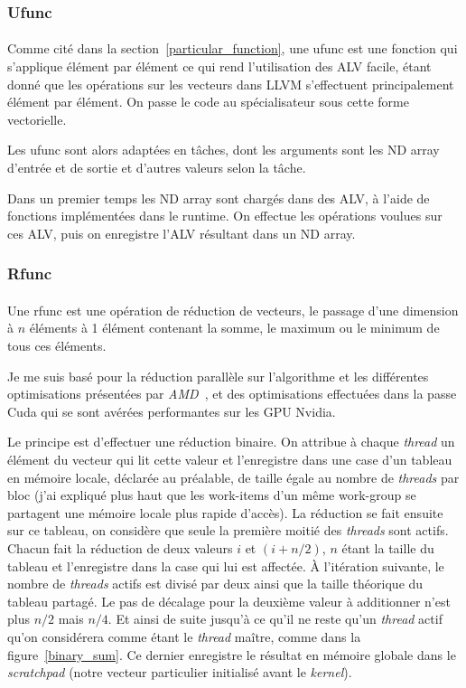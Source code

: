 \subsubsection{Ufunc}
\paragraph{}
Comme cité dans la section~\ref{particular_function}, une ufunc est une fonction
qui s'applique élément par élément ce qui rend l'utilisation des ALV facile,
étant donné que les opérations sur les vecteurs dans LLVM s'effectuent
principalement élément par élément. On passe le code au spécialisateur sous
cette forme vectorielle.

Les ufunc sont alors adaptées en tâches, dont les arguments sont les ND array
d'entrée et de sortie et d'autres valeurs selon la tâche.

Dans un premier temps les ND array sont chargés dans des ALV, à l'aide de
fonctions implémentées dans le runtime. On effectue les opérations voulues sur
ces ALV, puis on enregistre l’ALV résultant dans un ND array.

\subsubsection{Rfunc}
\paragraph{}
Une rfunc est une opération de réduction de vecteurs, le passage d'une dimension
à $n$ éléments à 1 élément contenant la somme, le maximum ou le minimum de tous
ces éléments.

Je me suis basé pour la réduction parallèle sur l'algorithme et les différentes
optimisations présentées par \emph{AMD}~\cite{ocl_reduction}, et des
optimisations effectuées dans la passe Cuda qui se sont avérées performantes sur
les GPU Nvidia.

Le principe est d'effectuer une réduction binaire. On attribue à chaque
\emph{thread} un élément du vecteur qui lit cette valeur et l'enregistre dans
une case d'un tableau en mémoire locale, déclarée au préalable, de taille égale
au nombre de \emph{threads} par bloc (j'ai expliqué plus haut que les work-items
d'un même work-group se partagent une mémoire locale plus rapide d'accès). La
réduction se fait ensuite sur ce tableau, on considère que seule la première
moitié des \emph{threads} sont actifs. Chacun fait la réduction de deux valeurs
$i$ et $(i+n/2)$, $n$ étant la taille du tableau et l'enregistre dans la case
qui lui est affectée. À l'itération suivante, le nombre de \emph{threads} actifs
est divisé par deux ainsi que la taille théorique du tableau partagé. Le pas de
décalage pour la deuxième valeur à additionner n'est plus $n/2$ mais $n/4$. Et
ainsi de suite jusqu'à ce qu'il ne reste qu'un \emph{thread} actif qu'on
considérera comme étant le \emph{thread} maître, comme dans la
figure~\ref{binary_sum}. Ce dernier enregistre le résultat en mémoire globale
dans le \emph{scratchpad} (notre vecteur particulier initialisé avant le
\emph{kernel}).

